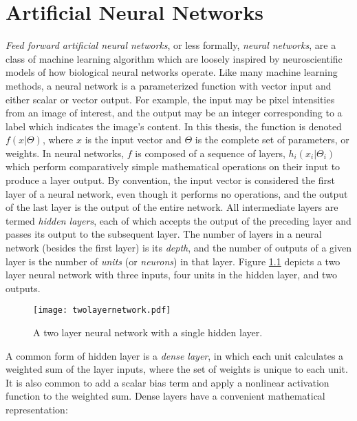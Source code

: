 

\chapter{Artificial Neural Networks}
\label{chap:neuralnetworks}

\textit{Feed forward artificial neural networks}, or less formally, \textit{neural networks}, are a class of machine learning algorithm which are loosely inspired by neuroscientific models of how biological neural networks operate\cite{mcculloch1943}. 
Like many machine learning methods, a neural network is a parameterized function with vector input and either scalar or vector output.
For example, the input may be pixel intensities from an image of interest, and the output may be an integer corresponding to a label which indicates the image's content.
In this thesis, the function is denoted $f(x|\Theta)$, where $x$ is the input vector and $\Theta$ is the complete set of parameters, or weights.
In neural networks, $f$ is composed of a sequence of layers, $h_i(x_i|\Theta_i)$ which perform comparatively simple mathematical operations on their input to produce a layer output.
By convention, the input vector is considered the first layer of a neural network, even though it performs no operations, and the output of the last layer is the output of the entire network.
All intermediate layers are termed \textit{hidden layers}, each of which accepts the output of the preceding layer and passes its output to the subsequent layer.
The number of layers in a neural network (besides the first layer) is its \textit{depth}, and the number of outputs of a given layer is the number of \textit{units} (or \textit{neurons}) in that layer.
Figure \ref{fig:twolayernetwork} depicts a two layer neural network with three inputs, four units in the hidden layer, and two outputs.

\begin{figure}
	\centering
	\texttt{[image: twolayernetwork.pdf]}
	\caption{A two layer neural network with a single hidden layer.}
	\label{fig:twolayernetwork}
\end{figure}

A common form of hidden layer is a \textit{dense layer}, in which each unit calculates a weighted sum of the layer inputs, where the set of weights is unique to each unit.
It is also common to add a scalar bias term and apply a nonlinear activation function to the weighted sum.
Dense layers have a convenient mathematical representation:

